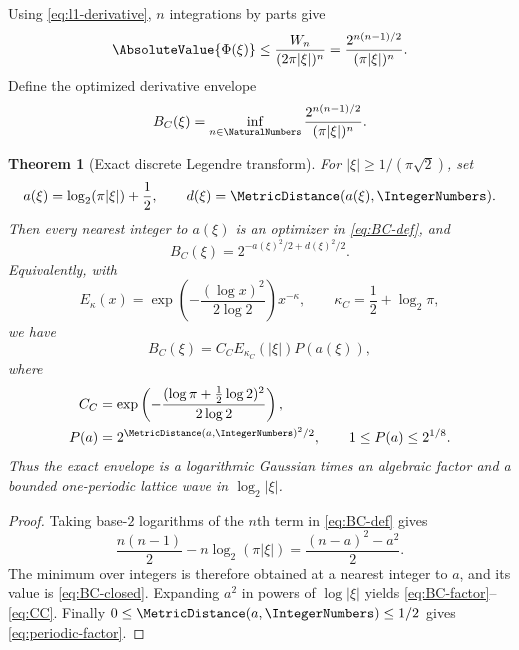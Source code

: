 \documentclass[11pt,a4paper]{article}
\newtheorem{theorem}{Theorem}[section]
\theoremstyle{definition}
\theoremstyle{remark}
\begin{document}
Using \eqref{eq:l1-derivative}, $n$ integrations by parts give
\begin{equation}
  \AbsoluteValue{\Phi(\xi)}
  \le\frac{W_n}{(2\pi|\xi|)^n}
  =\frac{2^{n(n-1)/2}}{(\pi|\xi|)^n}.
  \label{eq:prefix-bound}
\end{equation}
Define the optimized derivative envelope
\begin{equation}
  B_C(\xi)=
  \inf_{n\in\NaturalNumbers}
  \frac{2^{n(n-1)/2}}{(\pi|\xi|)^n}.
  \label{eq:BC-def}
\end{equation}

\begin{theorem}[Exact discrete Legendre transform]
\label{thm:discrete-legendre}
For $|\xi|\ge 1/(\pi\sqrt2)$, set
\begin{equation}
  a(\xi)=\log_2(\pi|\xi|)+\frac12,
  \qquad
  d(\xi)=\MetricDistance(a(\xi),\IntegerNumbers).
  \label{eq:a-d}
\end{equation}
Then every nearest integer to $a(\xi)$ is an optimizer in
\eqref{eq:BC-def}, and
\begin{equation}
  B_C(\xi)
  =2^{-a(\xi)^2/2+d(\xi)^2/2}.
  \label{eq:BC-closed}
\end{equation}
Equivalently, with
\begin{equation}
 E_\kappa(x)=
 \exp\left(-\frac{(\log x)^2}{2\log2}\right)x^{-\kappa},
 \qquad
 \kappa_C=\frac12+\log_2\pi,
 \label{eq:Ekappa}
\end{equation}
we have
\begin{equation}
 B_C(\xi)=C_C E_{\kappa_C}(|\xi|)P(a(\xi)),
 \label{eq:BC-factor}
\end{equation}
where
\begin{align}
 C_C&=\exp\left(
 -\frac{(\log\pi+\tfrac12\log2)^2}{2\log2}
 \right),
 \label{eq:CC}\\
 P(a)&=2^{\MetricDistance(a,\IntegerNumbers)^2/2},
 \qquad
 1\le P(a)\le2^{1/8}.
 \label{eq:periodic-factor}
\end{align}
Thus the exact envelope is a logarithmic Gaussian times an algebraic factor and a
bounded one-periodic lattice wave in $\log_2|\xi|$.
\end{theorem}

\begin{proof}
Taking base-$2$ logarithms of the $n$th term in \eqref{eq:BC-def} gives
\[
  \frac{n(n-1)}2-n\log_2(\pi|\xi|)
  =\frac{(n-a)^2-a^2}{2}.
\]
The minimum over integers is therefore obtained at a nearest integer to $a$, and its
value is \eqref{eq:BC-closed}.  Expanding $a^2$ in powers of $\log|\xi|$ yields
\eqref{eq:BC-factor}--\eqref{eq:CC}.  Finally
$0\le\MetricDistance(a,\IntegerNumbers)\le1/2$ gives \eqref{eq:periodic-factor}.
\end{proof}
\end{document}
